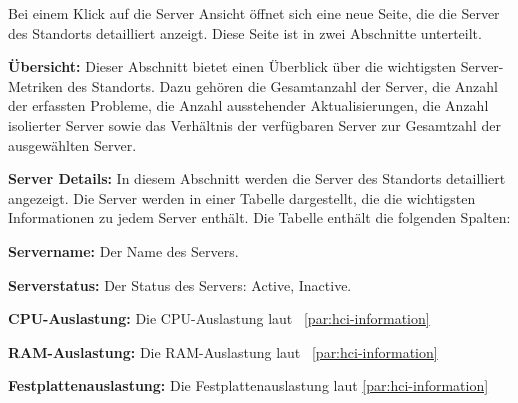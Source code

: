 \begin{compactitem}
\begin{compactitem}
\begin{compactitem}
            Bei einem Klick auf die Server Ansicht öffnet sich eine neue Seite, die die Server des Standorts detailliert anzeigt.
            Diese Seite ist in zwei Abschnitte unterteilt.

            \begin{compactitem}
                \item \textbf{Übersicht:} Dieser Abschnitt bietet einen Überblick über die wichtigsten Server-Metriken des Standorts. 
                Dazu gehören die Gesamtanzahl der Server, die Anzahl der erfassten Probleme, die Anzahl ausstehender Aktualisierungen, 
                die Anzahl isolierter Server sowie das Verhältnis der verfügbaren Server zur Gesamtzahl der ausgewählten Server.

                \item \textbf{Server Details:} In diesem Abschnitt werden die Server des Standorts detailliert angezeigt.
                Die Server werden in einer Tabelle dargestellt, die die wichtigsten Informationen zu jedem Server enthält.
                Die Tabelle enthält die folgenden Spalten:
                \begin{compactitem}
                    \item \textbf{Servername:} Der Name des Servers.
                    \item \textbf{Serverstatus:} Der Status des Servers: Active, Inactive.
                    \item \textbf{CPU-Auslastung:} Die CPU-Auslastung laut ~\ref{par:hci-information}
                    \item \textbf{RAM-Auslastung:} Die RAM-Auslastung laut ~\ref{par:hci-information}
                    \item \textbf{Festplattenauslastung:} Die Festplattenauslastung laut \ref{par:hci-information}
                \end{compactitem}


\end{compactitem}
\end{compactitem}
\end{compactitem}
\end{compactitem}
